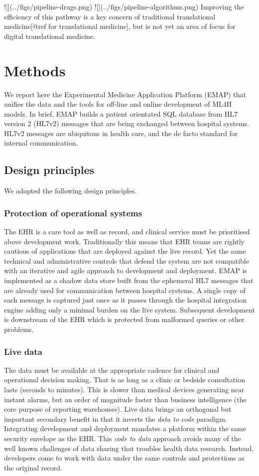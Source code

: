 \documentclass[pmlr,twocolumn,10pt]{jmlr} %
\begin{document}
![](../figs/pipeline-drugs.png)
![](../figs/pipeline-algorithms.png)
Improving the efficiency of this pathway is a key concern of traditional translational medicine[@ref for translational medicine], but is not yet an area of focus for digital translational medicine.

\section{Methods}
We report here the Experimental Medicine Application Platform (EMAP) that unifies the data and the tools for off-line and online development of ML4H models. In brief, EMAP builds a patient orientated SQL database from HL7 version 2 (HL7v2) messages that are being exchanged between hospital systems. HL7v2 messages are ubiquitous in health care, and the de facto standard for internal communication.

\subsection{Design principles}
We adopted the following design principles.

\subsubsection{Protection of operational systems}
The EHR is a care tool as well as record, and clinical service must be prioritised above development work. Traditionally this means that EHR teams are rightly cautious of applications that are deployed against the live record. Yet the same technical and administrative controls that defend the system are not compatible with an iterative and agile approach to development and deployment.
EMAP is implemented as a shadow data store built from the ephemeral HL7 messages that are already used for communication between hospital systems. A single copy of each message is captured just once as it passes through the hospital integration engine adding only a minimal burden on the live system. Subsequent development is downstream of the EHR which is protected from malformed queries or other problems.

\subsubsection{Live data}
The data must be available at the appropriate cadence for clinical and operational decision making. That is as long as a clinic or bedside consultation lasts (seconds to minutes). This is slower than medical devices generating near instant alarms, but an order of magnitude faster than business intelligence (the core purpose of reporting warehouses).
Live data brings an orthogonal but important secondary benefit in that it inverts the \textit{data to code} paradigm.\citep{guinney2018} Integrating development and deployment mandates a platform within the same security envelope as the EHR. This \textit{code to data} approach avoids many of the well known challenges of data sharing that troubles health data research.\citep{powles2017} Instead, developers come to work with data under the same controls and protections as the original record.
\end{document}
